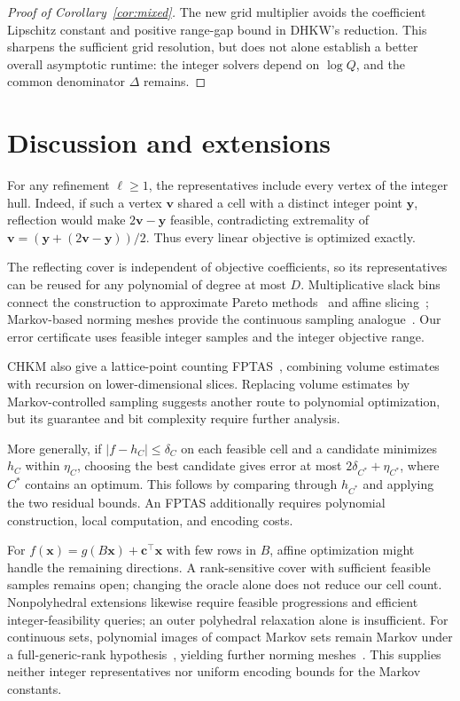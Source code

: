 \documentclass[final,5p,times,twocolumn]{elsarticle}
\theoremstyle{definition}\newtheorem{definition}{Definition}[section]
\theoremstyle{remark}\newtheorem{remark}[theorem]{Remark}
\begin{document}
\begin{proof}[Proof of Corollary~\ref{cor:mixed}]
The new grid multiplier avoids the coefficient Lipschitz constant and positive range-gap bound in DHKW's reduction. This sharpens the sufficient grid resolution, but does not alone establish a better overall asymptotic runtime: the integer solvers depend on $\log Q$, and the common denominator $\Delta$ remains.
\end{proof}

\section{Discussion and extensions}\label{sec:conclusion}
For any refinement $\ell\ge1$, the representatives include every vertex of the integer hull. Indeed, if such a vertex $\mathbf v$ shared a cell with a distinct integer point $\mathbf y$, reflection would make $2\mathbf v-\mathbf y$ feasible, contradicting extremality of $\mathbf v=(\mathbf y+(2\mathbf v-\mathbf y))/2$. Thus every linear objective is optimized exactly.

The reflecting cover is independent of objective coefficients, so its representatives can be reused for any polynomial of degree at most $D$. Multiplicative slack bins connect the construction to approximate Pareto methods~\cite{PY} and affine slicing~\cite{HWZ}; Markov-based norming meshes provide the continuous sampling analogue~\cite[Propositions~1--3]{PV}. Our error certificate uses feasible integer samples and the integer objective range.

CHKM also give a lattice-point counting FPTAS~\cite[Theorem~3.1]{CHKM}, combining volume estimates with recursion on lower-dimensional slices. Replacing volume estimates by Markov-controlled sampling suggests another route to polynomial optimization, but its guarantee and bit complexity require further analysis.

More generally, if $|f-h_C|\le\delta_C$ on each feasible cell and a candidate minimizes $h_C$ within $\eta_C$, choosing the best candidate gives error at most $2\delta_{C^*}+\eta_{C^*}$, where $C^*$ contains an optimum. This follows by comparing through $h_{C^*}$ and applying the two residual bounds. An FPTAS additionally requires polynomial construction, local computation, and encoding costs.

For $f(\mathbf{x})=g(B\mathbf{x})+\mathbf c^\top\mathbf{x}$ with few rows in $B$, affine optimization might handle the remaining directions. A rank-sensitive cover with sufficient feasible samples remains open; changing the oracle alone does not reduce our cell count. Nonpolyhedral extensions likewise require feasible progressions and efficient integer-feasibility queries; an outer polyhedral relaxation alone is insufficient. For continuous sets, polynomial images of compact Markov sets remain Markov under a full-generic-rank hypothesis~\cite[Theorem~1.4]{Pierzchala}, yielding further norming meshes~\cite[Proposition~2]{PV}. This supplies neither integer representatives nor uniform encoding bounds for the Markov constants.
\end{document}

